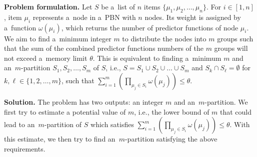 \documentclass[runningheads,a4paper]{llncs}
\begin{document}
\medskip\noindent\textbf{Problem formulation.}
Let $S$ be a~list of $n$ items $\{\mu_1,\mu_2,\dots,\mu_n\}$.
For $i \in [1,n]$, item $\mu_i$ represents a~node in a~PBN with $n$ nodes. Its weight is assigned
by a~function $\omega(\mu_i)$,
which returns the number of predictor functions of node $\mu_i$.
We aim to find a~minimum integer $m$ to distribute the nodes into $m$ groups
such that the sum of the combined predictor functions numbers of the $m$ groups will not exceed
a~memory limit $\theta$.
This is equivalent to finding a~minimum $m$ and an~$m$-partition $S_1, S_2, \dots, S_m$ of $S$,
i.e., $S=S_1 \cup S_2 \cup \dots \cup S_m$ and $S_k \cap S_\ell =\emptyset$ for $k,\ell \in \{1,2,\dots,m\}$,
such that $\sum_{i=1}^{m}\left(\prod_{\mu_j \in S_i} \omega(\mu_j)\right) \leq \theta$.

\medskip\noindent\textbf{Solution.}
The problem has two outputs:
an integer $m$ and an~$m$-partition.
We first try to estimate a potential value of $m$,
i.e., the lower bound of $m$ that could lead to an~$m$-partition of $S$
which satisfies $\sum_{i=1}^{m}\left(\prod_{\mu_j \in S_i} \omega(\mu_j)\right)  \leq \theta$.
With this estimate, we then try to find an~$m$-partition satisfying the above requirements.
\end{document}
